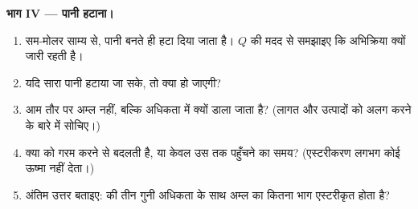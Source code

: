 \begin{problem}[{सप्ताहांत समस्या --- जब ऐल्कोहॉल तीन गुनी अधिकता में
डाला जाए तो कितना एस्टर?}]
\medskip
\noindent\textbf{भाग IV --- पानी हटाना।}
\begin{enumerate}[resume]
  \item सम-मोलर साम्य से, पानी बनते ही हटा दिया जाता है।
        $Q$ की मदद से समझाइए कि अभिक्रिया क्यों जारी रहती है।
  \item यदि सारा पानी हटाया जा सके, तो  क्या हो जाएगी?
  \item आम तौर पर अम्ल नहीं, बल्कि  अधिकता में क्यों डाला जाता है? (लागत
        और उत्पादों को अलग करने के बारे में सोचिए।)
  \item क्या  को गरम करने से  बदलती है, या केवल
        उस तक पहुँचने का समय? (एस्टरीकरण लगभग कोई ऊष्मा नहीं देता।)
  \item अंतिम उत्तर बताइए:  की तीन गुनी अधिकता के साथ अम्ल का कितना भाग
        एस्टरीकृत होता है?
\end{enumerate}
\end{problem}
